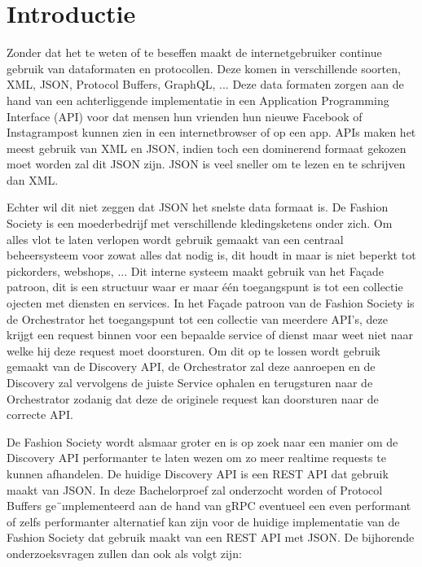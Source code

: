 
\section{Introductie} %
\label{sec:introductie}

Zonder dat het te weten of te beseffen maakt de internetgebruiker continue gebruik van dataformaten en protocollen. Deze komen in verschillende soorten, XML, JSON, Protocol Buffers, GraphQL, ... Deze data formaten zorgen aan de hand van een achterliggende implementatie in een Application Programming Interface (API) voor dat mensen hun vrienden hun nieuwe Facebook of Instagrampost kunnen zien in een internetbrowser of op een app. 
APIs maken het meest gebruik van XML en JSON, indien toch een dominerend formaat gekozen moet worden zal dit JSON zijn. JSON is veel sneller om te lezen en te schrijven dan XML.

Echter wil dit niet zeggen dat JSON het snelste data formaat is. 
De Fashion Society is een moederbedrijf met verschillende kledingsketens onder zich. Om alles vlot te laten verlopen wordt gebruik gemaakt van een centraal beheersysteem voor zowat alles dat nodig is, dit houdt in maar is niet beperkt tot pickorders, webshops, ... Dit interne systeem maakt gebruik van het Façade patroon, dit is een structuur waar er maar één toegangspunt is tot een collectie ojecten met diensten en services. In het Façade patroon van de Fashion Society is de Orchestrator het toegangspunt tot een collectie van meerdere API’s, deze krijgt een request binnen voor een bepaalde service of dienst maar weet niet naar welke hij deze request moet doorsturen. Om dit op te lossen wordt gebruik gemaakt van de Discovery API, de Orchestrator zal deze aanroepen en de Discovery zal vervolgens de juiste Service ophalen en terugsturen naar de Orchestrator zodanig dat deze de originele request kan doorsturen naar de correcte API.

De Fashion Society wordt alsmaar groter en is op zoek naar een manier om de Discovery API performanter te laten wezen om zo meer realtime requests te kunnen afhandelen. De huidige Discovery API is een REST API dat gebruik maakt van JSON. In deze Bachelorproef zal onderzocht worden of Protocol Buffers ge¨ımplementeerd aan de hand van gRPC eventueel een even performant of zelfs performanter alternatief kan zijn voor de huidige implementatie van de Fashion Society dat gebruik maakt van een REST API met JSON. De bijhorende onderzoeksvragen zullen dan ook als volgt zijn:

